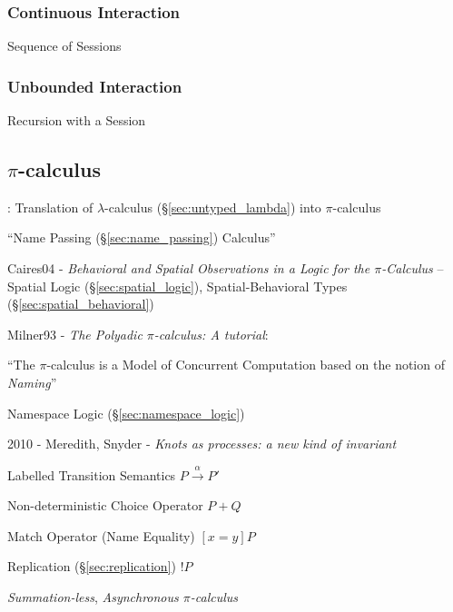 \subsubsection{Continuous Interaction}\label{sec:continuous_interaction}

Sequence of Sessions



\subsubsection{Unbounded Interaction}\label{sec:unbounded_interaction}

Recursion with a Session



\subsection{$\pi$-calculus}\label{sec:pi_calculus}

\cite{milner-parrow-walker92}

\cite{milner92}: Translation of $\lambda$-calculus
(\S\ref{sec:untyped_lambda}) into $\pi$-calculus

``Name Passing (\S\ref{sec:name_passing}) Calculus''

Caires04 - \emph{Behavioral and Spatial Observations in a Logic for the
  $\pi$-Calculus} -- Spatial Logic (\S\ref{sec:spatial_logic}),
Spatial-Behavioral Types (\S\ref{sec:spatial_behavioral})

Milner93 - \emph{The Polyadic $\pi$-calculus: A tutorial}:

``The $\pi$-calculus is a Model of Concurrent Computation based on the notion of
\emph{Naming}''

\fist Namespace Logic (\S\ref{sec:namespace_logic})

2010 - Meredith, Snyder - \emph{Knots as processes: a new kind of invariant}

Labelled Transition Semantics $P \xrightarrow{\alpha} P'$

Non-deterministic Choice Operator $P + Q$

Match Operator (Name Equality) $[x=y]P$

Replication (\S\ref{sec:replication}) $!P$

\emph{Summation-less}, \emph{Asynchronous
  $\pi$-calculus} %
\cite{honda-vasconcelos-kubo98}

